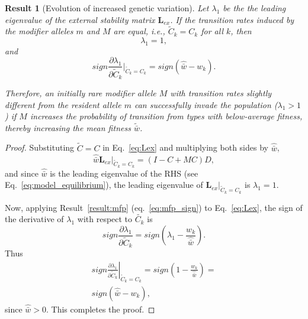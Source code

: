 \documentclass[12pt, twocolumn]{extarticle}
\newtheorem{result}{Result}
\newcommand{\cl}{\mathbf{L}}
\begin{document}
\begin{result}[Evolution of increased genetic variation]
Let $\lambda_1$ be the the leading eigenvalue of the external stability matrix $\cl_{ex}$.
If the transition rates induced by the modifier alleles $m$ and $M$ are equal, i.e., $\tilde{C}_k=C_k$ for all $k$, then 
\begin{equation}
\lambda_1=1,
\end{equation}
and
\begin{equation}
sign \frac{\partial \lambda_1}{\partial \tilde{C}_k}\bigg\rvert_{\tilde{C}_k = C_k} = 
sign(\hat{\bar w} - w_k).
\end{equation}

Therefore, an initially rare modifier allele $M$ with transition rates slightly different from the resident allele $m$ can successfully invade the population ($\lambda_1>1$) if $M$ increases the probability of transition from types with below-average fitness, thereby increasing the  mean fitness $\tilde{\bar w}$.
\end{result}

\begin{proof}
Substituting $\tilde{C}=C$ in Eq.~\ref{eq:Lex} and multiplying both sides by $\hat{\bar w}$,
\begin{equation}
\hat{\bar w} \cl_{ex}\big\rvert_{\tilde{C}_k = C_k} = (I-C+MC) D,
\end{equation}
and since $\hat{\bar w}$ is the leading eigenvalue of the RHS (see Eq.~\ref{eq:model_equilibrium}),
the leading eigenvalue of $\cl_{ex}\big\rvert_{\tilde{C}_k = C_k}$ is $\lambda_1=1$.

Now, applying Result~\ref{result:mfp} (eq.~\ref{eq:mfp_sign}) to Eq.~\ref{eq:Lex}, the sign of the derivative of $\lambda_1$ with respect to $\tilde{C_k}$ is
\begin{equation}
sign \frac{\partial \lambda_1}{\partial \tilde{C}_k} =
sign\left(\lambda_1 - \frac{w_k}{\hat{\bar w}}\right).
\end{equation}
Thus
\begin{equation}
\begin{aligned}
sign \left.\frac{\partial \lambda_1}{\partial \tilde{C}_k}\right\rvert_{\tilde{C}_k = C_k} = 
sign\left(1 - \frac{w_k}{\hat{\bar w}}\right) = \\
sign(\hat{\bar w} - w_k),
\end{aligned}
\end{equation}
since $\hat{\bar w}>0$.
This completes the proof.
\end{proof}
\end{document}
